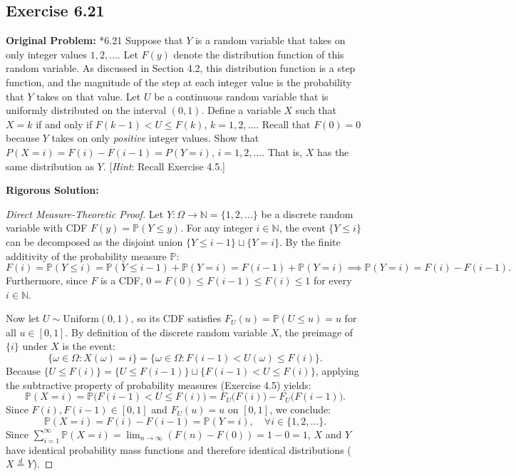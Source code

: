 \documentclass[11pt, letterpaper]{article}
\theoremstyle{definition}
\theoremstyle{remark}
\newcommand{\N}{\mathbb{N}}
\newcommand{\Prob}{\mathbb{P}}
\begin{document}
\subsection{Exercise 6.21}

\textbf{Original Problem:}
*6.21 Suppose that $Y$ is a random variable that takes on only integer values $1, 2, \dots$. Let $F(y)$ denote the distribution function of this random variable. As discussed in Section 4.2, this distribution function is a step function, and the magnitude of the step at each integer value is the probability that $Y$ takes on that value. Let $U$ be a continuous random variable that is uniformly distributed on the interval $(0, 1)$. Define a variable $X$ such that $X = k$ if and only if $F(k - 1) < U \le F(k)$, $k = 1, 2, \dots$. Recall that $F(0) = 0$ because $Y$ takes on only \textit{positive} integer values. Show that $P(X = i) = F(i) - F(i - 1) = P(Y = i)$, $i = 1, 2, \dots$. That is, $X$ has the same distribution as $Y$. [\textit{Hint}: Recall Exercise 4.5.]

\hrulefill

\textbf{Rigorous Solution:}

\begin{proof}[Direct Measure-Theoretic Proof]
Let $Y : \Omega \to \N = \{1, 2, \dots\}$ be a discrete random variable with CDF $F(y) = \Prob(Y \le y)$. For any integer $i \in \N$, the event $\{Y \le i\}$ can be decomposed as the disjoint union $\{Y \le i - 1\} \sqcup \{Y = i\}$. By the finite additivity of the probability measure $\Prob$:
\[
    F(i) = \Prob(Y \le i) = \Prob(Y \le i - 1) + \Prob(Y = i) = F(i - 1) + \Prob(Y = i) \implies \Prob(Y = i) = F(i) - F(i - 1).
\]
Furthermore, since $F$ is a CDF, $0 = F(0) \le F(i - 1) \le F(i) \le 1$ for every $i \in \N$.

Now let $U \sim \text{Uniform}(0, 1)$, so its CDF satisfies $F_U(u) = \Prob(U \le u) = u$ for all $u \in [0, 1]$. By definition of the discrete random variable $X$, the preimage of $\{i\}$ under $X$ is the event:
\[
    \{\omega \in \Omega : X(\omega) = i\} = \{\omega \in \Omega : F(i - 1) < U(\omega) \le F(i)\}.
\]
Because $\{U \le F(i)\} = \{U \le F(i - 1)\} \sqcup \{F(i - 1) < U \le F(i)\}$, applying the subtractive property of probability measures (Exercise 4.5) yields:
\[
    \Prob(X = i) = \Prob\big(F(i - 1) < U \le F(i)\big) = F_U\big(F(i)\big) - F_U\big(F(i - 1)\big).
\]
Since $F(i), F(i - 1) \in [0, 1]$ and $F_U(u) = u$ on $[0, 1]$, we conclude:
\[
    \Prob(X = i) = F(i) - F(i - 1) = \Prob(Y = i), \quad \forall i \in \{1, 2, \dots\}.
\]
Since $\sum_{i=1}^{\infty} \Prob(X = i) = \lim_{n\to\infty} (F(n) - F(0)) = 1 - 0 = 1$, $X$ and $Y$ have identical probability mass functions and therefore identical distributions ($X \stackrel{d}{=} Y$).
\end{proof}
\end{document}

